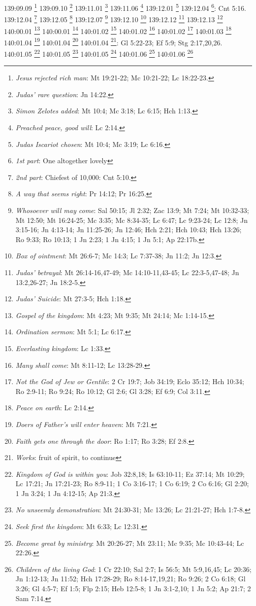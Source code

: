 {{{{{{{{{{{{{{{{{{{{{{{{{{{{{{{{{{139:09.09 \footnote{\textit{Jesus rejected rich man}: Mt 19:21-22; Mc 10:21-22; Lc 18:22-23.}
139:09.10 \footnote{\textit{Judas' rare question}: Jn 14:22.}
139:11.01 \footnote{\textit{Simon Zelotes added}: Mt 10:4; Mc 3:18; Lc 6:15; Hch 1:13.}
139:11.06 \footnote{\textit{Preached peace, good will}: Lc 2:14.}
139:12.01 \footnote{\textit{Judas Iscariot chosen}: Mt 10:4; Mc 3:19; Lc 6:16.}
139:12.04 \footnote{\textit{1st part}: One altogether lovely}: Cnt 5:16.}
139:12.04 \footnote{\textit{2nd part}: Chiefest of 10,000: Cnt 5:10.}
139:12.05 \footnote{\textit{A way that seems right}: Pr 14:12; Pr 16:25.}
139:12.07 \footnote{\textit{Whosoever will may come}: Sal 50:15; Jl 2:32; Zac 13:9; Mt 7:24; Mt 10:32-33; Mt 12:50; Mt 16:24-25; Mc 3:35; Mc 8:34-35; Lc 6:47; Lc 9:23-24; Lc 12:8; Jn 3:15-16; Jn 4:13-14; Jn 11:25-26; Jn 12:46; Hch 2:21; Hch 10:43; Hch 13:26; Ro 9:33; Ro 10:13; 1 Jn 2:23; 1 Jn 4:15; 1 Jn 5:1; Ap 22:17b.}
139:12.10 \footnote{\textit{Box of ointment}: Mt 26:6-7; Mc 14:3; Lc 7:37-38; Jn 11:2; Jn 12:3.}
139:12.12 \footnote{\textit{Judas' betrayal}: Mt 26:14-16,47-49; Mc 14:10-11,43-45; Lc 22:3-5,47-48; Jn 13:2,26-27; Jn 18:2-5.}
139:12.13 \footnote{\textit{Judas' Suicide}: Mt 27:3-5; Hch 1:18.}
140:00.01 \footnote{\textit{Gospel of the kingdom}: Mt 4:23; Mt 9:35; Mt 24:14; Mc 1:14-15.}
140:00.01 \footnote{\textit{Ordination sermon}: Mt 5:1; Lc 6:17.}
140:01.02 \footnote{\textit{Everlasting kingdom}: Lc 1:33.}
140:01.02 \footnote{\textit{Many shall come}: Mt 8:11-12; Lc 13:28-29.}
140:01.02 \footnote{\textit{Not the God of Jew or Gentile}: 2 Cr 19:7; Job 34:19; Eclo 35:12; Hch 10:34; Ro 2:9-11; Ro 9:24; Ro 10:12; Gl 2:6; Gl 3:28; Ef 6:9; Col 3:11.}
140:01.03 \footnote{\textit{Peace on earth}: Lc 2:14.}
140:01.04 \footnote{\textit{Doers of Father's will enter heaven}: Mt 7:21.}
140:01.04 \footnote{\textit{Faith gets one through the door}: Ro 1:17; Ro 3:28; Ef 2:8.}
140:01.04 \footnote{\textit{Works}: fruit of spirit, to continue}: Gl 5:22-23; Ef 5:9; Stg 2:17,20,26.}
140:01.05 \footnote{\textit{Kingdom of God is within you}: Job 32:8,18; Is 63:10-11; Ez 37:14; Mt 10:29; Lc 17:21; Jn 17:21-23; Ro 8:9-11; 1 Co 3:16-17; 1 Co 6:19; 2 Co 6:16; Gl 2:20; 1 Jn 3:24; 1 Jn 4:12-15; Ap 21:3.}
140:01.05 \footnote{\textit{No unseemly demonstration}: Mt 24:30-31; Mc 13:26; Lc 21:21-27; Hch 1:7-8.}
140:01.05 \footnote{\textit{Seek first the kingdom}: Mt 6:33; Lc 12:31.}
140:01.06 \footnote{\textit{Become great by ministry}: Mt 20:26-27; Mt 23:11; Mc 9:35; Mc 10:43-44; Lc 22:26.}
140:01.06 \footnote{\textit{Children of the living God}: 1 Cr 22:10; Sal 2:7; Is 56:5; Mt 5:9,16,45; Lc 20:36; Jn 1:12-13; Jn 11:52; Hch 17:28-29; Ro 8:14-17,19,21; Ro 9:26; 2 Co 6:18; Gl 3:26; Gl 4:5-7; Ef 1:5; Flp 2:15; Heb 12:5-8; 1 Jn 3:1-2,10; 1 Jn 5:2; Ap 21:7; 2 Sam 7:14.}
}}}}}}}}}}}}}}}}}}}}}}}}}}}}}}}}
